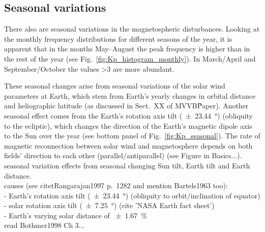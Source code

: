 \subsection{Seasonal \Kp{} variations}
There also are seasonal variations in the magnetospheric disturbances. Looking at the monthly \Kp{} frequency distributions for different seasons of the year, it is apparent that in the months May--August the \Kp{} peak frequency is higher than in the rest of the year (see Fig.~\ref{fig:Kp_histogram_monthly}). In March/April and September/October the \Kp{} values \num{>3} are more abundant.\\
\begin{figure}
\end{figure}
These seasonal \Kp{} changes arise from seasonal variations of the solar wind parameters at Earth, which stem from Earth's yearly changes in orbital distance and heliographic latitude (as discussed in Sect.~XX of MVVB\~Paper). Another seasonal effect comes from the Earth's rotation axis tilt (\SI{+-23.44}{\degree}) (obliquity to the ecliptic), which changes the direction of the Earth's magnetic dipole axis to the Sun over the year (see bottom panel of Fig.~\ref{fig:Kp_seasonal}). The rate of magnetic reconnection between solar wind and magnetosphere depends on both fields' direction to each other (parallel/antiparallel) (see Figure in Basics...).\\

\Kp{} seasonal variation effects from seasonal changing Sun tilt, Earth tilt and Earth distance.\\
causes (see citet{Rangarajan1997} p.~1282 and mention Bartels1963 too):\\
- Earth's rotation axis tilt (\SI{+-23.44}{\degree}) (obliquity to orbit/inclination of equator)\\
- solar rotation axis tilt (\SI{+-7.25}{\degree}) (cite 'NASA Earth fact sheet')\\
- Earth's varying solar distance of \SI{+-1.67}{\percent}\\
read Bothmer1998 Ch 3...\\


